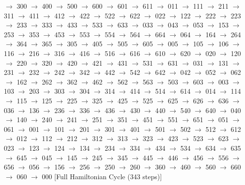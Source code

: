 $\rightarrow$ 300 $\rightarrow$ 400 $\rightarrow$ 500 $\rightarrow$ 600 $\rightarrow$ 601 $\rightarrow$ 611 $\rightarrow$ 011 $\rightarrow$ 111 $\rightarrow$ 211 $\rightarrow$ 311 $\rightarrow$ 411 $\rightarrow$ 412 $\rightarrow$ 422 $\rightarrow$ 522 $\rightarrow$ 622 $\rightarrow$ 022 $\rightarrow$ 122 $\rightarrow$ 222 $\rightarrow$ 223 $\rightarrow$ 233 $\rightarrow$ 333 $\rightarrow$ 433 $\rightarrow$ 533 $\rightarrow$ 633 $\rightarrow$ 033 $\rightarrow$ 043 $\rightarrow$ 053 $\rightarrow$ 153 $\rightarrow$ 253 $\rightarrow$ 353 $\rightarrow$ 453 $\rightarrow$ 553 $\rightarrow$ 554 $\rightarrow$ 564 $\rightarrow$ 664 $\rightarrow$ 064 $\rightarrow$ 164 $\rightarrow$ 264 $\rightarrow$ 364 $\rightarrow$ 365 $\rightarrow$ 305 $\rightarrow$ 405 $\rightarrow$ 505 $\rightarrow$ 605 $\rightarrow$ 005 $\rightarrow$ 105 $\rightarrow$ 106 $\rightarrow$ 116 $\rightarrow$ 216 $\rightarrow$ 316 $\rightarrow$ 416 $\rightarrow$ 516 $\rightarrow$ 616 $\rightarrow$ 610 $\rightarrow$ 620 $\rightarrow$ 020 $\rightarrow$ 120 $\rightarrow$ 220 $\rightarrow$ 320 $\rightarrow$ 420 $\rightarrow$ 421 $\rightarrow$ 431 $\rightarrow$ 531 $\rightarrow$ 631 $\rightarrow$ 031 $\rightarrow$ 131 $\rightarrow$ 231 $\rightarrow$ 232 $\rightarrow$ 242 $\rightarrow$ 342 $\rightarrow$ 442 $\rightarrow$ 542 $\rightarrow$ 642 $\rightarrow$ 042 $\rightarrow$ 052 $\rightarrow$ 062 $\rightarrow$ 162 $\rightarrow$ 262 $\rightarrow$ 362 $\rightarrow$ 462 $\rightarrow$ 562 $\rightarrow$ 563 $\rightarrow$ 503 $\rightarrow$ 603 $\rightarrow$ 003 $\rightarrow$ 103 $\rightarrow$ 203 $\rightarrow$ 303 $\rightarrow$ 304 $\rightarrow$ 314 $\rightarrow$ 414 $\rightarrow$ 514 $\rightarrow$ 614 $\rightarrow$ 014 $\rightarrow$ 114 $\rightarrow$ 115 $\rightarrow$ 125 $\rightarrow$ 225 $\rightarrow$ 325 $\rightarrow$ 425 $\rightarrow$ 525 $\rightarrow$ 625 $\rightarrow$ 626 $\rightarrow$ 636 $\rightarrow$ 036 $\rightarrow$ 136 $\rightarrow$ 236 $\rightarrow$ 336 $\rightarrow$ 436 $\rightarrow$ 430 $\rightarrow$ 440 $\rightarrow$ 540 $\rightarrow$ 640 $\rightarrow$ 040 $\rightarrow$ 140 $\rightarrow$ 240 $\rightarrow$ 241 $\rightarrow$ 251 $\rightarrow$ 351 $\rightarrow$ 451 $\rightarrow$ 551 $\rightarrow$ 651 $\rightarrow$ 051 $\rightarrow$ 061 $\rightarrow$ 001 $\rightarrow$ 101 $\rightarrow$ 201 $\rightarrow$ 301 $\rightarrow$ 401 $\rightarrow$ 501 $\rightarrow$ 502 $\rightarrow$ 512 $\rightarrow$ 612 $\rightarrow$ 012 $\rightarrow$ 112 $\rightarrow$ 212 $\rightarrow$ 312 $\rightarrow$ 313 $\rightarrow$ 323 $\rightarrow$ 423 $\rightarrow$ 523 $\rightarrow$ 623 $\rightarrow$ 023 $\rightarrow$ 123 $\rightarrow$ 124 $\rightarrow$ 134 $\rightarrow$ 234 $\rightarrow$ 334 $\rightarrow$ 434 $\rightarrow$ 534 $\rightarrow$ 634 $\rightarrow$ 635 $\rightarrow$ 645 $\rightarrow$ 045 $\rightarrow$ 145 $\rightarrow$ 245 $\rightarrow$ 345 $\rightarrow$ 445 $\rightarrow$ 446 $\rightarrow$ 456 $\rightarrow$ 556 $\rightarrow$ 656 $\rightarrow$ 056 $\rightarrow$ 156 $\rightarrow$ 256 $\rightarrow$ 250 $\rightarrow$ 260 $\rightarrow$ 360 $\rightarrow$ 460 $\rightarrow$ 560 $\rightarrow$ 660 $\rightarrow$ 060 $\rightarrow$ 000 [Full Hamiltonian Cycle (343 steps)]

